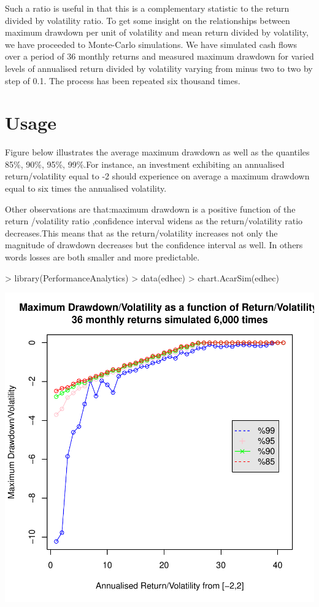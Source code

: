 \documentclass[12pt,letterpaper,english]{article}
\begin{document}
Such a ratio is useful in that this is a complementary statistic to the return divided by volatility ratio. To get some insight on the relationships between maximum drawdown per unit of volatility and mean  return divided by volatility, we have proceeded to Monte-Carlo simulations. We have simulated cash flows over a period of 36 monthly returns and measured maximum drawdown for varied levels of  annualised return divided by volatility varying from minus two to two by step of 0.1. The process has  been repeated six thousand times.

\section{Usage}
Figure below illustrates the average maximum drawdown as well as the quantiles 85\%, 90\%, 95\%, 99\%.For instance, an investment exhibiting an annualised return/volatility equal to -2 should experience on average a maximum drawdown equal to six times the annualised volatility.

Other observations are that:maximum drawdown is a positive function of the return /volatility ratio ,confidence interval widens as the return/volatility ratio decreases.This means that as the return/volatility increases not only the magnitude of drawdown decreases but the confidence interval as well. In others words losses are both smaller and more predictable.

\begin{Schunk}
\begin{Sinput}
> library(PerformanceAnalytics)
> data(edhec)
> chart.AcarSim(edhec)
\end{Sinput}
\end{Schunk}
\includegraphics{ShaneAcarMaxLoss-003}
\end{document}
